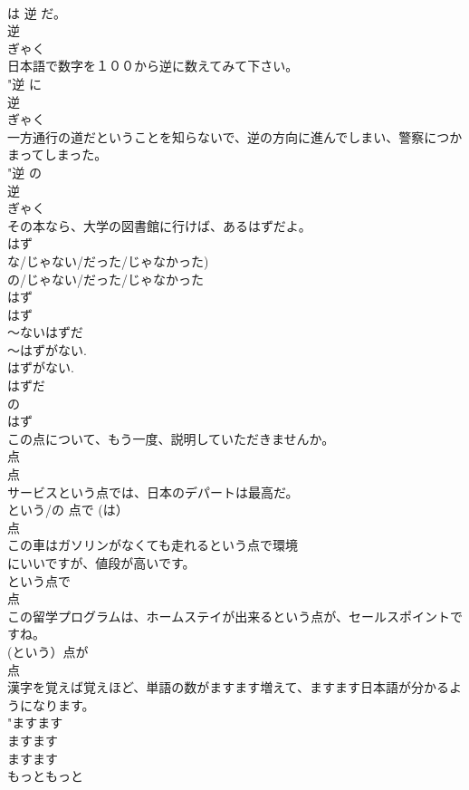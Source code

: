 \documentclass[8pt]{extreport}
\begin{document}
\begin{CJK}{UTF8}{min}
{\\	は 逆 だ。 
\\	逆 
\\	ぎゃく
\\	日本語で数字を１００から逆に数えてみて下さい。	
\\	"逆 に 
\\	逆 
\\	ぎゃく
\\	一方通行の道だということを知らないで、逆の方向に進んでしまい、警察につかまってしまった。	
\\	"逆 の 
\\	逆 
\\	ぎゃく
\\	その本なら、大学の図書館に行けば、あるはずだよ。	
\\	はず　
\\	{な/じゃない/だった/じゃなかった) 
\\	{の/じゃない/だった/じゃなかった} 
\\	はず 
\\	はず 
\\	〜ないはずだ 
\\	〜はずがない.
\\	はずがない. 
\\	はずだ 
\\	の 
\\	はず 
\\	この点について、もう一度、説明していただきませんか。	
\\	点 
\\	点 
\\	サービスという点では、日本のデパートは最高だ。	
\\	{という/の} 点で (は） 
\\	点 
\\	この車はガソリンがなくても走れるという点で環境
\\	にいいですが、値段が高いです。	
\\	という点で 
\\	点 
\\	この留学プログラムは、ホームステイが出来るという点が、セールスポイントですね。	
\\	(という）点が 
\\	点 
\\	漢字を覚えば覚えほど、単語の数がますます増えて、ますます日本語が分かるようになります。	
\\	"ますます
\\	ますます 
\\	ますます 
\\	もっともっと 
}}
\end{CJK}
\end{document}
